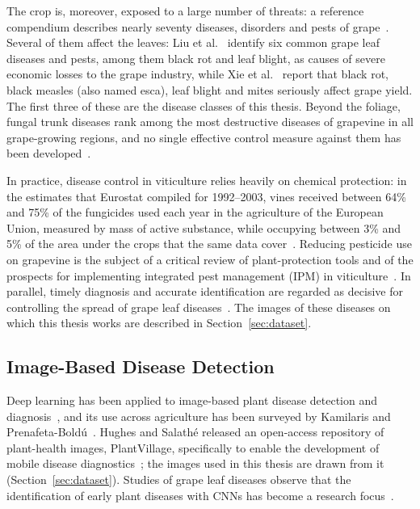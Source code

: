 The crop is, moreover, exposed to a large number of threats: a reference
compendium describes nearly seventy diseases, disorders and pests of
grape~\cite{wilcox2015compendium}. Several of them affect the leaves:
Liu et al.~\cite{liu2020grape} identify six common grape leaf diseases and
pests, among them black rot and leaf blight, as causes of severe economic
losses to the grape industry, while Xie et al.~\cite{xie2020deep} report that
black rot, black measles (also named esca), leaf blight and mites seriously
affect grape yield. The first three of these are the disease classes of this
thesis. Beyond the foliage, fungal trunk diseases rank among the most
destructive diseases of grapevine in all grape-growing regions, and no single
effective control measure against them has been
developed~\cite{gramaje2018managing}.

In practice, disease control in viticulture relies heavily on chemical
protection: in the estimates that Eurostat compiled for 1992--2003, vines
received between 64\% and 75\% of the fungicides used each year in the
agriculture of the European Union, measured by mass of active substance,
while occupying between 3\% and 5\% of the area under the crops that the same
data cover~\cite{eurostat2007ppp}.
Reducing pesticide use on grapevine is the subject of a critical review of
plant-protection tools and of the prospects for implementing integrated pest
management (IPM) in viticulture~\cite{pertot2017critical}. In parallel, timely
diagnosis and accurate identification are regarded as decisive for
controlling the spread of grape leaf diseases~\cite{liu2020grape}. The images
of these diseases on which this thesis works are described in
Section~\ref{sec:dataset}.


\subsection{Image-Based Disease Detection}
\label{sec:motivation-detection}

Deep learning has been applied to image-based plant disease detection and
diagnosis~\cite{mohanty2016plantdisease,ferentinos2018deep}, and its use
across agriculture has been surveyed by Kamilaris and
Prenafeta-Bold\'u~\cite{kamilaris2018deep}. Hughes and Salath\'e released an
open-access repository of plant-health images, PlantVillage, specifically to
enable the development of mobile disease
diagnostics~\cite{hughes2015plantvillage}; the images used in this thesis are
drawn from it (Section~\ref{sec:dataset}). Studies of grape leaf diseases
observe that the identification of early plant diseases with CNNs has become
a research focus~\cite{liu2020grape,xie2020deep}.

